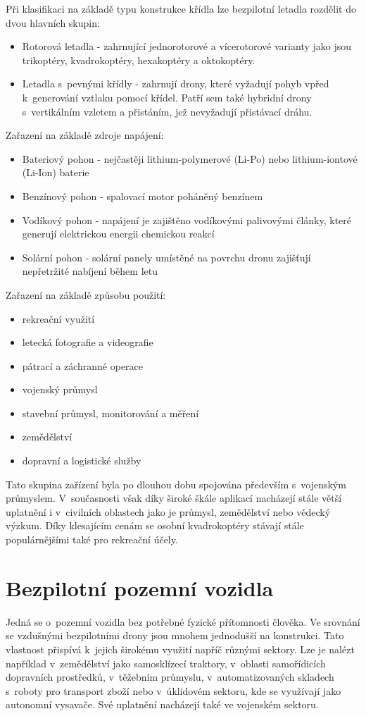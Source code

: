 \documentclass[12pt]{report}
\begin{document}
Při klasifikaci na základě typu konstrukce křídla lze bezpilotní letadla rozdělit do dvou hlavních skupin:
\begin{itemize}
	\item Rotorová letadla - zahrnující jednorotorové a vícerotorové varianty jako jsou trikoptéry, kvadrokoptéry, hexakoptéry a oktokoptéry.
	\item Letadla s~pevnými křídly - zahrnují drony, které vyžadují pohyb vpřed k~generování vztlaku pomocí křídel. Patří sem také hybridní drony s~vertikálním vzletem a přistáním, jež nevyžadují přistávací dráhu.
\end{itemize}

Zařazení na základě zdroje napájení:
\begin{itemize}
	\item Bateriový pohon - nejčastěji lithium-polymerové (Li-Po) nebo lithium-iontové (Li-Ion) baterie
	\item Benzínový pohon - spalovací motor poháněný benzínem
	\item Vodíkový pohon - napájení je zajištěno vodíkovými palivovými články, které generují elektrickou energii chemickou reakcí
	\item Solární pohon - solární panely umístěné na povrchu dronu zajišťují nepřetržité nabíjení během letu
\end{itemize}

Zařazení na základě způsobu použití:
\begin{itemize}
	\item rekreační využití
	\item letecká fotografie a videografie
	\item pátrací a záchranné operace
	\item vojenský průmysl
	\item stavební průmysl, monitorování a měření
	\item zemědělství
	\item dopravní a logistické služby
\end{itemize}

Tato skupina zařízení byla po dlouhou dobu spojována především s~vojenským průmyslem. V~současnosti však díky široké škále aplikací nacházejí stále větší uplatnění i v~civilních oblastech jako je průmysl, zemědělství nebo vědecký výzkum. Díky klesajícím cenám se osobní kvadrokoptéry stávají stále populárnějšími také pro rekreační účely. \cite{mainbook} \cite{whatisadrone}

\section[Bezpilotní pozemní vozidla]{Bezpilotní pozemní vozidla}
Jedná se o~pozemní vozidla bez potřebné fyzické přítomnosti člověka. Ve srovnání se vzdušnými bezpilotními drony jsou mnohem jednodušší na konstrukci. Tato vlastnost přispívá k~jejich širokému využití napříč různými sektory. Lze je nalézt například v~zemědělství jako samosklízecí traktory, v~oblasti samořídicích dopravních prostředků, v~těžebním průmyslu, v~automatizovaných skladech s~roboty pro transport zboží nebo v~úklidovém sektoru, kde se využívají jako autonomní vysavače. Své uplatnění nacházejí také ve vojenském sektoru. \cite{mainbook}
\end{document}
